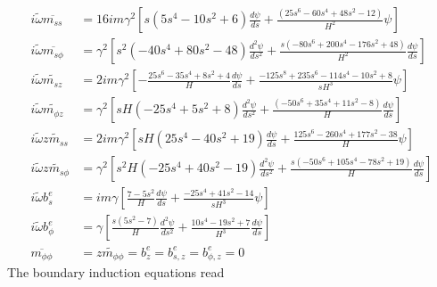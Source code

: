 \begin{equation}
\begin{aligned}
    i \widetilde{\omega} \overline{m_{ss}} &= 16 i m \gamma^2 \left[s \left(5 s^{4} - 10s^2 + 6\right) \frac{d\psi}{d s} + \frac{\left(25 s^{6} - 60 s^{4} + 48 s^{2} - 12\right)}{H^{2}} \psi\right] \\
    i \widetilde{\omega} \overline{m_{s\phi}} &= \gamma^2 \left[s^{2} \left(- 40 s^{4} + 80 s^{2} - 48\right) \frac{d^{2}\psi}{d s^{2}} + \frac{s(- 80 s^{6} + 200 s^{4} - 176 s^{2} + 48)}{H^{2}} \frac{d\psi}{d s}\right] \\
    i \widetilde{\omega} \widetilde{m_{sz}} &= 2im\gamma^2 \left[- \frac{25 s^{6} - 35 s^{4} + 8 s^{2} + 4}{H} \frac{d \psi}{d s} + \frac{- 125 s^{8} + 235 s^{6} - 114 s^{4} - 10 s^{2} + 8}{sH^3} \psi \right] \\
    i \widetilde{\omega} \widetilde{m_{\phi z}} &= \gamma^2 \left[sH \left(- 25 s^{4} + 5 s^{2} + 8\right) \frac{d^{2}\psi}{d s^{2}} + \frac{\left(- 50 s^{6} + 35 s^{4} + 11 s^{2} - 8\right)}{H} \frac{d \psi}{d s}\right] \\
    i \widetilde{\omega} \widetilde{zm_{ss}} &= 2 i m \gamma^2 \left[s H \left(25 s^{4} - 40 s^{2} + 19\right) \frac{d\psi}{d s} + \frac{125 s^{6} - 260 s^{4} + 177 s^{2} - 38}{H} \psi \right] \\
    i \widetilde{\omega} \widetilde{zm_{s\phi}} &= \gamma^2 \left[ s^2H \left(- 25 s^{4} + 40 s^{2} - 19\right) \frac{d^{2} \psi}{d s^{2}} + \frac{s \left(- 50 s^{6} + 105 s^{4} - 78 s^{2} + 19\right)}{H} \frac{d \psi}{d s}\right] \\
    i \widetilde{\omega} b_{s}^e &= im \gamma \left[\frac{7 - 5 s^{2}}{H} \frac{d \psi}{d s} + \frac{- 25 s^{4} + 41 s^{2} - 14}{s H^{3}} \psi\right] \\
    i \widetilde{\omega} b_{\phi}^e &= \gamma \left[\frac{s \left(5 s^{2} - 7\right)}{H} \frac{d^{2}\psi}{d s^{2}} + \frac{10 s^{4} - 19 s^{2} + 7}{H^{3}} \frac{d \psi}{d s}\right] \\
    \overline{m_{\phi\phi}} &= \widetilde{zm_{\phi\phi}} = b_{z}^e = b_{s, z}^e = b_{\phi, z}^e = 0
    \end{aligned}
\end{equation}
The boundary induction equations read
